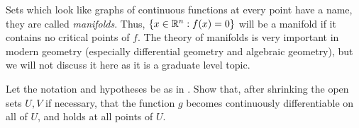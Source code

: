 \begin{rmk}\label{ii:6.8.4}
  Sets which look like graphs of continuous functions at every point have a name, they are called \emph{manifolds}.
  Thus, \(\left\lbrace x \in \mathbb{R}^n : f(x) = 0\right\rbrace\) will be a manifold if it contains no critical points of \(f\).
  The theory of manifolds is very important in modern geometry (especially differential geometry and algebraic geometry), but we will not discuss it here as it is a graduate level topic.
\end{rmk}

\exercisesection

\begin{ex}\label{ii:ex:6.8.1}
  Let the notation and hypotheses be as in .
  Show that, after shrinking the open sets \(U, V\) if necessary, that the function \(g\) becomes continuously differentiable on all of \(U\), and  holds at all points of \(U\).
\end{ex}
